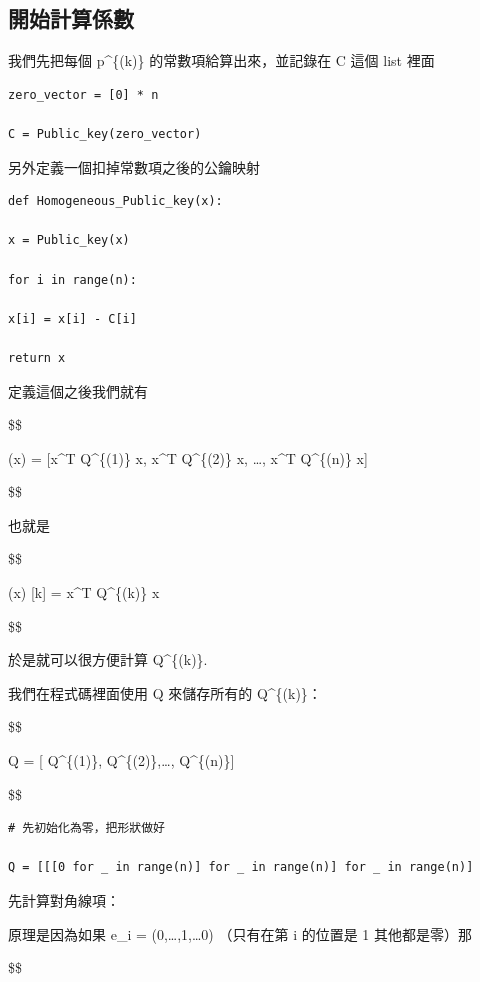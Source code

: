 \documentclass[
]{article}
\begin{document}
\hypertarget{ux958bux59cbux8a08ux7b97ux4fc2ux6578}{%
\subsection{開始計算係數}\label{ux958bux59cbux8a08ux7b97ux4fc2ux6578}}

我們先把每個 p\^{}\{(k)\} 的常數項給算出來，並記錄在 C 這個 list 裡面

\begin{verbatim}
zero_vector = [0] * n

C = Public_key(zero_vector)
\end{verbatim}

另外定義一個扣掉常數項之後的公鑰映射

\begin{verbatim}
def Homogeneous_Public_key(x):

x = Public_key(x)

for i in range(n):

x[i] = x[i] - C[i]

return x
\end{verbatim}

定義這個之後我們就有

\$\$

(x) = {[}x\^{}T Q\^{}\{(1)\} x, x\^{}T
Q\^{}\{(2)\} x, \ldots, x\^{}T Q\^{}\{(n)\} x{]}

\$\$

也就是

\$\$

(x) {[}k{]} = x\^{}T Q\^{}\{(k)\} x

\$\$

於是就可以很方便計算 Q\^{}\{(k)\}.

我們在程式碼裡面使用 Q 來儲存所有的 Q\^{}\{(k)\}：

\$\$

Q = {[} Q\^{}\{(1)\}, Q\^{}\{(2)\},\ldots, Q\^{}\{(n)\}{]}

\$\$

\begin{verbatim}
# 先初始化為零，把形狀做好

Q = [[[0 for _ in range(n)] for _ in range(n)] for _ in range(n)]
\end{verbatim}

先計算對角線項：

原理是因為如果 e\_i = (0,\ldots,1,\ldots0) （只有在第 i 的位置是 1
其他都是零）那

\$\$
\end{document}
